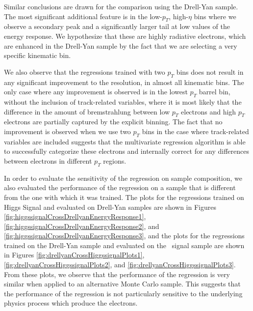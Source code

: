 \documentclass{cmspaper}
\begin{document}
Similar conclusions are drawn for the comparison using the Drell-Yan sample. 
The most significant additional feature is in the low-$p_T$, high-$\eta$ bins where
we observe a secondary peak and a significantly larger tail at low values of the
energy response. We hypothesize that these are highly radiative electrons, which are 
enhanced in the Drell-Yan sample by the fact that we are selecting a very specific
kinematic bin. 

We also observe that the regressions trained with two $p_T$ bins does not result in any 
significant improvement to the resolution, in almost all kinematic bins. The only
case where any improvement is observed is in the lowest $p_{T}$ barrel bin, without
the inclusion of track-related variables, where it is most likely that the difference
in the amount of bremstrahlung between low $p_{T}$ electrons and high $p_{T}$ electrons 
are partially captured by the explicit binning. The fact that no improvement is
observed when we use two $p_{T}$ bins in the case where track-related variables are 
included suggests that the multivariate regression algorithm is able to successfully
categorize these electrons and internally correct for any differences between electrons
in different $p_{T}$ regions.


In order to evaluate the sensitivity of the regression on sample composition, we also evaluated the performance
of the regression on a sample that is different from the one with which it was trained. The plots for the 
regressions trained on Higgs Signal and evaluated on Drell-Yan samples are shown in 
Figures \ref{fig:higgssignalCrossDrellyanEnergyResponse1}, \ref{fig:higgssignalCrossDrellyanEnergyResponse2}, and
\ref{fig:higgssignalCrossDrellyanEnergyResponse3}, and the plots for the regressions trained on the Drell-Yan sample
and evaluated on the \HiggsToZZ\ signal sample are shown in Figures \ref{fig:drellyanCrossHiggssignalPlots1},
\ref{fig:drellyanCrossHiggssignalPlots2}, and \ref{fig:drellyanCrossHiggssignalPlots3}. From these plots, we observe
that the performance of the regression is very similar when applied to an alternative Monte Carlo sample. This 
suggests that the performance of the regression is not particularly sensitive to the underlying physics process
which produce the electrons.  
\end{document}

